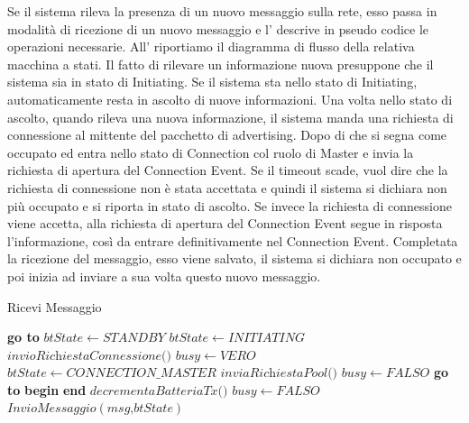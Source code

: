 Se il sistema rileva la presenza di un nuovo messaggio sulla rete, esso passa in modalità di ricezione di un nuovo messaggio e l' descrive in pseudo codice le operazioni necessarie. All' riportiamo il diagramma di flusso della relativa macchina a stati. Il fatto di rilevare un informazione nuova presuppone che il sistema sia in stato di Initiating. Se il sistema sta nello stato di Initiating, automaticamente resta in ascolto di nuove informazioni. Una volta nello stato di ascolto, quando rileva una nuova informazione, il sistema manda una richiesta di connessione al mittente del pacchetto di advertising. Dopo di che si segna come occupato ed entra nello stato di Connection col ruolo di Master e invia la richiesta di apertura del Connection Event. Se il timeout scade, vuol dire che la richiesta di connessione non è stata accettata e quindi il sistema si dichiara non più occupato e si riporta in stato di ascolto. Se invece la richiesta di connessione viene accetta, alla richiesta di apertura del Connection Event segue in risposta l'informazione, così da entrare definitivamente nel Connection Event. Completata la ricezione del messaggio, esso viene salvato, il sistema si dichiara non occupato e poi inizia ad inviare a sua volta questo nuovo messaggio.
\begin{algorithm}[t]
	\caption{Ricevi Messaggio}\label{alg:ricevi_msg}
	\begin{algorithmic}[1]
			\State \textbf{go to} 
		\EndIf
		\Label {}
		\State $\textit{btState} \gets STANDBY$
		\State $\textit{btState} \gets INITIATING$
		\Label {}
		\State $ \textit{invioRichiestaConnessione()}$
		\State $ \textit{busy} \gets VERO$
		\State $ \textit{btState} \gets CONNECTION\_MASTER $
		\State $ \textit{inviaRichiestaPool()}$
			\State $ \textit{busy} \gets FALSO$ 
			\State \textbf{go to} 
		\EndIf
		\State \textbf{begin}
			\State{}
		\State \textbf{end}
		\State $ \textit{decrementaBatteriaTx()} $
		\State $ \textit{busy} \gets FALSO$
		\State $ \textit{InvioMessaggio}\left(\textit{msg,btState}\right)  $
		\EndFunction
	\end{algorithmic}
\end{algorithm}

